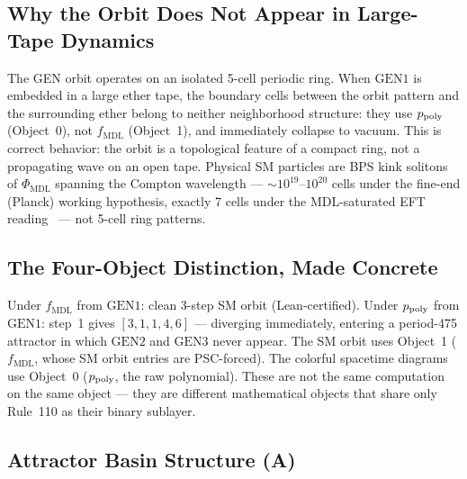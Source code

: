 \documentclass[11pt]{article}
\theoremstyle{remark}
\newcommand{\PHIMDL}{\ensuremath{\Phi_{\mathrm{MDL}}}}
\newcommand{\fmdl}{\ensuremath{f_{\mathrm{MDL}}}}
\newcommand{\CatA}{\textbf{A}}
\begin{document}
\subsection{Why the Orbit Does Not Appear in Large-Tape Dynamics}

The GEN orbit operates on an isolated 5-cell periodic ring. When $\mathrm{GEN}1$
is embedded in a large ether tape, the boundary cells between the orbit pattern
and the surrounding ether belong to neither neighborhood structure: they use
$p_{\rm poly}$ (Object~0), not $\fmdl{}$ (Object~1), and immediately collapse
to vacuum. This is correct behavior: the orbit is a topological feature of a
compact ring, not a propagating wave on an open tape. Physical SM particles are
BPS kink solitons of $\PHIMDL{}$ spanning the Compton wavelength ---
${\sim}10^{19}$--$10^{20}$ cells under the fine-end (Planck) working
hypothesis, exactly 7 cells under the MDL-saturated EFT
reading~\cite{SpivackPhiMDLField,SpivackCompleteness,SpivackSpin7Lattice}
--- not 5-cell ring patterns.

\subsection{The Four-Object Distinction, Made Concrete}

Under $\fmdl{}$ from $\mathrm{GEN}1$: clean 3-step SM orbit (Lean-certified).
Under $p_{\rm poly}$ from $\mathrm{GEN}1$: step~1 gives $[3,1,1,4,6]$ ---
diverging immediately, entering a period-475 attractor in which $\mathrm{GEN}2$
and $\mathrm{GEN}3$ never appear. The SM orbit uses Object~1
($\fmdl{}$, whose SM orbit entries are PSC-forced). The colorful spacetime
diagrams use Object~0 ($p_{\rm poly}$, the raw polynomial). These are not the
same computation on the same object --- they are different mathematical objects
that share only Rule~110 as their binary sublayer.

\subsection{Attractor Basin Structure (\CatA{})}
\label{sec:basin}
\end{document}
